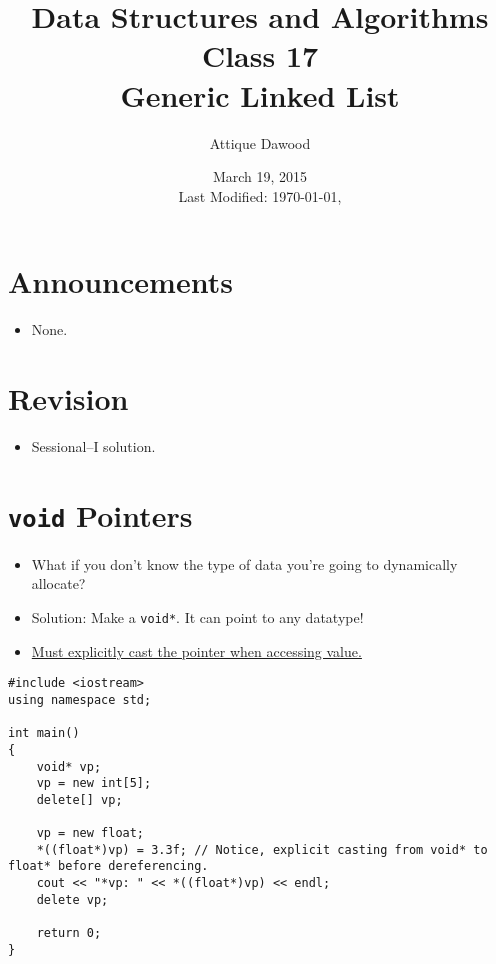 \documentclass[12pt,a4paper]{article}
\title{Data Structures and Algorithms\\Class 17\\Generic Linked List}
\author{Attique Dawood}
\date{March 19, 2015\\[0.2cm] Last Modified: \today, \currenttime}
\begin{document}
\maketitle
\section{Announcements}
\begin{itemize}
\item None.
\end{itemize}
\section{Revision}
\begin{itemize}
\item Sessional--I solution.
\end{itemize}
\section{\texttt{void} Pointers}
\begin{itemize}
\item What if you don't know the type of data you're going to dynamically allocate?
\item Solution: Make a \verb|void*|. It can point to any datatype!
\item \underline{Must explicitly cast the pointer when accessing value.}
\end{itemize}
\begin{lstlisting}[caption={\texttt{void*} usage}]
#include <iostream>
using namespace std;

int main()
{
	void* vp;
	vp = new int[5];
	delete[] vp;

	vp = new float;
	*((float*)vp) = 3.3f; // Notice, explicit casting from void* to float* before dereferencing.
	cout << "*vp: " << *((float*)vp) << endl;
	delete vp;

	return 0;
}
\end{lstlisting}
\end{document}
